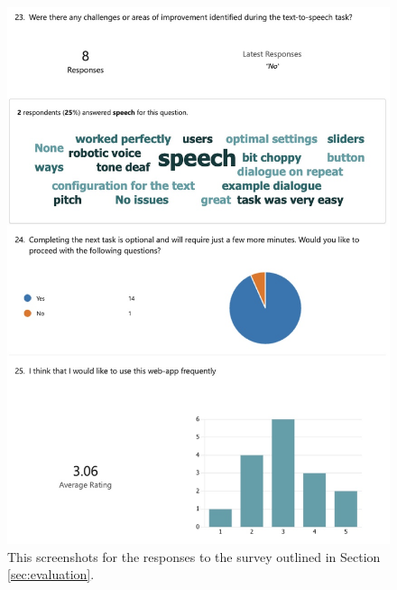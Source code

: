 \documentclass{l4proj}
\begin{document}
\begin{appendices}
\begin{figure}[H]
    \centering
    \includegraphics[width=0.75\linewidth]{dissertation/images/eval-6.jpeg}    
    \caption{This screenshots for the responses to the survey outlined in Section \ref{sec:evaluation}.}
    \label{fig:eval-survey-6} 
\end{figure}


\end{appendices}
\end{document}
